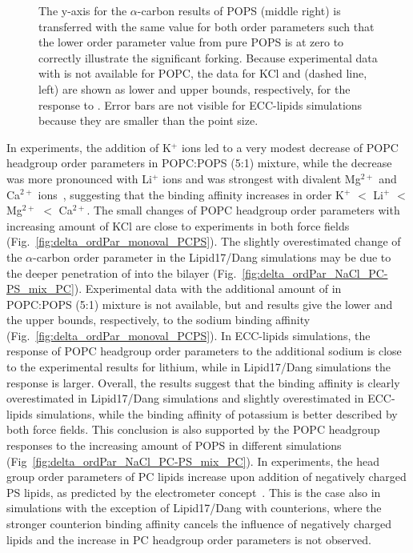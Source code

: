 \documentclass[journal=jpcbfk,manuscript=article]{achemso}
\begin{document}
\begin{figure}[tbp!]
{    The y-axis for the $\alpha$-carbon results of POPS (middle right) is transferred
    with the same value for both order parameters such that the lower order
    parameter value from pure POPS is at zero to correctly illustrate the significant forking.
    Because experimental data with  is not available for POPC, the data for KCl and  (dashed line, left)
    are shown as lower and upper bounds, respectively, for the response to . Error bars are not visible for ECC-lipids simulations because they are smaller than the point size.}
 \\
\end{figure} 


In experiments, the addition of K$^+$ ions led to a very modest decrease of POPC headgroup order parameters in POPC:POPS (5:1) mixture,
while the decrease was more pronounced with Li$^+$ ions and was strongest with divalent Mg$^{2+}$ and Ca$^{2+}$ ions~\cite{roux90},
suggesting that the binding affinity increases in order K$^{+}$ $<$ Li$^{+}$  $<$ Mg$^{2+}$  $<$ Ca$^{2+}$.
The small changes of POPC headgroup order parameters with increasing amount of KCl are close to experiments
in both force fields (Fig.~\ref{fig:delta_ordPar_monoval_PCPS}).
The slightly overestimated change of the $\alpha$-carbon
order parameter in the Lipid17/Dang simulations may be due to the
deeper penetration of  into the bilayer (Fig.~\ref{fig:delta_ordPar_NaCl_PC-PS_mix_PC}).
Experimental data with the additional amount of  in POPC:POPS (5:1) mixture is not available,
but  and  results give the lower and the upper bounds, respectively, to the sodium binding
affinity (Fig.~\ref{fig:delta_ordPar_monoval_PCPS}). In ECC-lipids simulations,
the response of POPC headgroup order parameters to the additional sodium is close to the
experimental results for lithium, while in Lipid17/Dang simulations the response is larger.
Overall, the results suggest that the  binding affinity is
clearly overestimated in Lipid17/Dang simulations and slightly overestimated in ECC-lipids simulations,
while the binding affinity of potassium is better described by both force fields.
This conclusion is also supported by the POPC headgroup responses to the
increasing amount of POPS in different simulations (Fig~\ref{fig:delta_ordPar_NaCl_PC-PS_mix_PC}).
In experiments, the head group order parameters of PC lipids increase upon addition of
negatively charged PS lipids, as predicted by the electrometer concept~\cite{seelig87,scherer87}.
This is the case also in simulations with the exception of
Lipid17/Dang with  counterions, where the stronger counterion binding affinity
cancels the influence of negatively charged lipids and the increase in PC headgroup
order parameters is not observed.%
\end{document}
